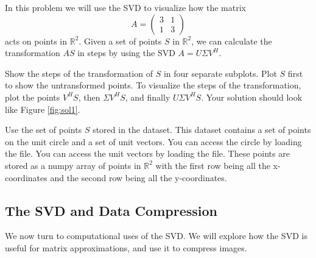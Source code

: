 \begin{problem}
In this problem we will use the SVD to visualize how the matrix
\begin{equation}
A =  \begin{pmatrix}3 & 1\\1 & 3\end{pmatrix}
\end{equation}
acts on points in $\mathbb{R}^2$.
Given a set of points $S$ in $\mathbb{R}^2$, we can calculate the transformation $AS$ in steps by using the SVD $A = U\Sigma V^H$.

Show the steps of the transformation of $S$ in four separate subplots.
Plot $S$ first to show the untransformed points.
To visualize the steps of the transformation, plot the points $V^HS$, then $\Sigma V^HS$, and finally $U\Sigma V^HS$.
Your solution should look like Figure \ref{fig:sol1}.

Use the set of points $S$ stored in the  dataset.
This dataset contains a set of points on the unit circle and a set of unit vectors. 
You can access the circle by loading the  file. 
You can access the unit vectors by loading the  file. 
These points are stored as a numpy array of points in $\mathbb{R}^2$ with the first row being all the x-coordinates and the second row being all the y-coordinates.
\end{problem}

\subsection*{The SVD and Data Compression}
We now turn to computational uses of the SVD. We will explore how the SVD is useful for matrix approximations, and use it to compress images.

